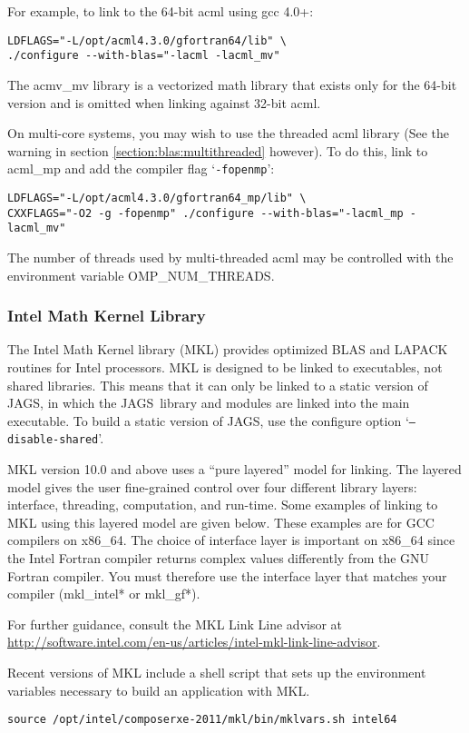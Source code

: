 \documentclass[11pt, a4paper, titlepage]{article}
\newcommand{\JAGS}{\textsf{JAGS}}
\newcommand{\code}[1]{{\bgroup{\normalfont\ttfamily #1}\egroup}}
\newcommand{\samp}[1]{{`\bgroup\normalfont\texttt{#1}'\egroup}}
\let\option=\samp
\begin{document}
For example, to link to the 64-bit acml using gcc 4.0+:
\begin{verbatim}
LDFLAGS="-L/opt/acml4.3.0/gfortran64/lib" \
./configure --with-blas="-lacml -lacml_mv" 
\end{verbatim}
The \code{acmv\_mv} library is a vectorized math library that
exists only for the 64-bit version and is omitted when linking against
32-bit acml.

On multi-core systems, you may wish to use the threaded acml library
(See the warning in section \ref{section:blas:multithreaded} however).
To do this, link to \code{acml\_mp} and add the compiler flag
\option{-fopenmp}:
\begin{verbatim}
LDFLAGS="-L/opt/acml4.3.0/gfortran64_mp/lib" \
CXXFLAGS="-O2 -g -fopenmp" ./configure --with-blas="-lacml_mp -lacml_mv" 
\end{verbatim}
The number of threads used by multi-threaded acml may be controlled
with the environment variable \code{OMP\_NUM\_THREADS}.

\subsubsection{Intel Math Kernel Library}

The Intel Math Kernel library (MKL) provides optimized BLAS and LAPACK
routines for Intel processors.  MKL is designed to be linked to
executables, not shared libraries. This means that it can only be
linked to a static version of \JAGS, in which the \JAGS\ library and
modules are linked into the main executable. To build a static version
of \JAGS, use the configure option \option{--disable-shared}.

MKL version 10.0 and above uses a ``pure layered'' model for linking.
The layered model gives the user fine-grained control over four
different library layers: interface, threading, computation, and
run-time. Some examples of linking to MKL using this layered model are
given below. These examples are for GCC compilers on
\code{x86\_64}. The choice of interface layer is important on
\code{x86\_64} since the Intel Fortran compiler returns complex values
differently from the GNU Fortran compiler. You must therefore use the
interface layer that matches your compiler (\code{mkl\_intel*} or
\code{mkl\_gf*}).

For further guidance, consult the MKL Link Line advisor at
\url{http://software.intel.com/en-us/articles/intel-mkl-link-line-advisor}.

Recent versions of MKL include a shell script that sets up the
environment variables necessary to build an application with MKL.
\begin{verbatim}
source /opt/intel/composerxe-2011/mkl/bin/mklvars.sh intel64
\end{verbatim}
\end{document}
